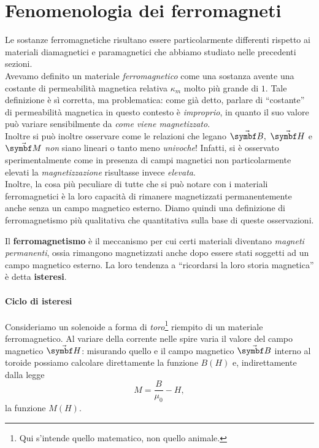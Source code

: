 \section{Fenomenologia dei ferromagneti}\label{ferromagnetici}
Le sostanze ferromagnetiche risultano essere particolarmente differenti rispetto ai materiali diamagnetici e paramagnetici che abbiamo studiato nelle precedenti sezioni.\\
Avevamo definito un materiale \textit{ferromagnetico} come una sostanza avente una costante di permeabilità magnetica relativa $\kappa_m$ molto più grande di $1$.
Tale definizione è sì corretta, ma problematica: come già detto, parlare di ``costante'' di permeabilità magnetica in questo contesto è \textit{improprio}, in quanto il suo valore può variare sensibilmente da \textit{come viene magnetizzato}.\\
Inoltre si può inoltre osservare come le relazioni che legano $\vba{B},\ \vba{H}$ e $\vba{M}$ \textit{non} siano lineari o tanto meno \textit{univoche}! Infatti, si è osservato sperimentalmente come in presenza di campi magnetici non particolarmente elevati la \textit{magnetizzazione} risultasse invece \textit{elevata}.\\
Inoltre, la cosa più peculiare di tutte che si può notare con i materiali ferromagnetici è la loro capacità di rimanere magnetizzati permanentemente anche senza un campo magnetico esterno. Diamo quindi una definizione di ferromagnetismo più qualitativa che quantitativa sulla base di queste osservazioni.
\begin{define}[Ferromagnetismo]
	Il \textbf{ferromagnetismo} è il meccanismo per cui certi materiali diventano \textit{magneti permanenti}, ossia rimangono magnetizzati anche dopo essere stati soggetti ad un campo magnetico esterno. La loro tendenza a ``ricordarsi la loro storia magnetica'' è detta \textbf{isteresi}.
\end{define}
\paragraph{Ciclo di isteresi}
Consideriamo un solenoide a forma di \textit{toro}\footnote{Qui s'intende quello matematico, non quello animale.} riempito di un materiale ferromagnetico. Al variare della corrente nelle spire varia il valore del campo magnetico $\vba{H}$: misurando quello e il campo magnetico $\vba{B}$ interno al toroide possiamo calcolare direttamente la funzione $B(H)$ e, indirettamente dalla legge
\begin{equation*}
	M=\frac{B}{\mu_0}-H,
\end{equation*}
la funzione $M(H)$.

